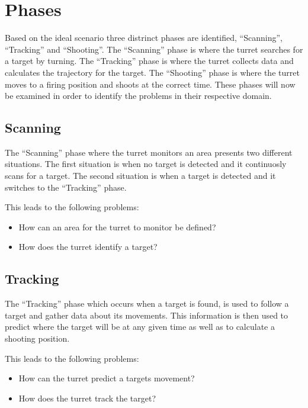 \section{Phases}
Based on the ideal scenario three distrinct phases are identified,
``Scanning'', ``Tracking'' and ``Shooting''. The ``Scanning'' phase is where
the turret searches for a target by turning. The ``Tracking'' phase is where the
turret collects data and calculates the trajectory for the target. The
``Shooting'' phase is where the turret moves to a firing position and shoots at
the correct time. These phases will now be examined in order to identify the
problems in their respective domain.

\subsection{Scanning}
The ``Scanning'' phase where the turret monitors an area presents two different
situations. The first situation is when no target is detected and it continuosly
scans for a target. The second situation is when a target is detected and it
switches to the ``Tracking'' phase.\nl

This leads to the following problems:
\begin{itemize}
  \item How can an area for the turret to monitor be defined?
  \item How does the turret identify a target?
\end{itemize}

% 
% 

\subsection{Tracking}
The ``Tracking'' phase which occurs when a target is found, is used to follow a
target and gather data about its movements. This information is then used to
predict where the target will be at any given time as well as to calculate a
shooting position.\nl

This leads to the following problems:
\begin{itemize}
  \item How can the turret predict a targets movement?
  \item How does the turret track the target?
\end{itemize}

